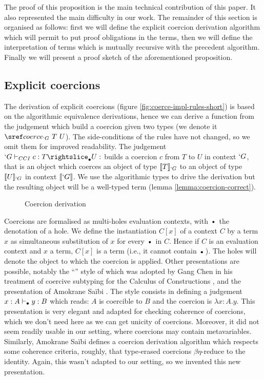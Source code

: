 \documentclass{llncs}
\begin{document}
The proof of this proposition is the main technical contribution of this
paper. It also represented the main difficulty in our work. 
The remainder of this section is organised as follows: first we will
define the explicit coercion derivation algorithm which will permit to
put proof obligations in the terms, then we will define the
interpretation of terms which is mutually recursive with the precedent
algorithm. Finally we will present a proof sketch of the aforementioned
proposition.

\subsection{Explicit coercions}
The derivation of explicit coercions (figure
\vref{fig:coerce-impl-rules-short}) is based on the
algorithmic equivalence derivations, hence we can derive a function from
the judgement which build a coercion given two types (we denote it $\coerce{`G}{T}{U}$). 
The side-conditions of the rules have not changed, so we omit them for
improved readability. The judgement $\subimpl{`G}{c}{T}{U}$ builds a
coercion $c$ from $T$ to $U$ in context $`G$, that is an object which
coerces an object of type $\llbracket T \rrbracket_{`G}$ to an object of type $\llbracket U \rrbracket_{`G}$
in context $\llbracket `G \rrbracket$. We use the algorithmic types to drive the
derivation but the resulting object will be a well-typed \Coq{} term
(lemma \ref{lemma:coercion-correct}). 

\begin{figure}[ht]
  \vspace{-1em}
  \subtisc
  \vspace{-2em}
  \caption{Coercion derivation}
  \label{fig:coerce-impl-rules-short}
  \vspace{-1em}
\end{figure}

Coercions are formalised as multi-holes evaluation contexts, with
$\ctxdot$ the denotation of a hole. We define the instantiation $C[x]$ of a context $C$
by a term $x$ as simultaneous substitution of $x$ for every $\ctxdot$ in $C$.
Hence if $C$ is an evaluation context and $x$ a term, $C[x]$ is a term
(i.e., it cannot contain $\ctxdot$).
The holes will denote the object to which the coercion is applied.
Other
presentations are possible, notably the ``\LMS{}'' style of \cite{longo95logic} which
was adopted by Gang Chen in his treatment of coercive subtyping for the
Calculus of Constructions \cite{conf/popl/Chen03}, and the presentation 
of Amokrane Sa\"ibi \cite{saibi97inheritance}. The \LMS{} style consists
in defining a judgement $x : A \vdash_{\bullet} y : B$ which reads: $A$ is
coercible to $B$ and the coercion is $\lambda x : A.y$. This
presentation is very elegant and adapted for checking coherence 
of coercions, which we don't need here as we can get unicity
of coercions. Moreover, it did not seem readily usable in
our setting, where coercions may contain metavariables. Similarly, Amokrane Sa\"ibi defines
a coercion derivation algorithm which respects some coherence criteria,
roughly, that type-erased coercions $\beta\eta$-reduce to the
identity. Again, this wasn't adapted to our setting, so we invented this
new presentation. 
 
\end{document}
